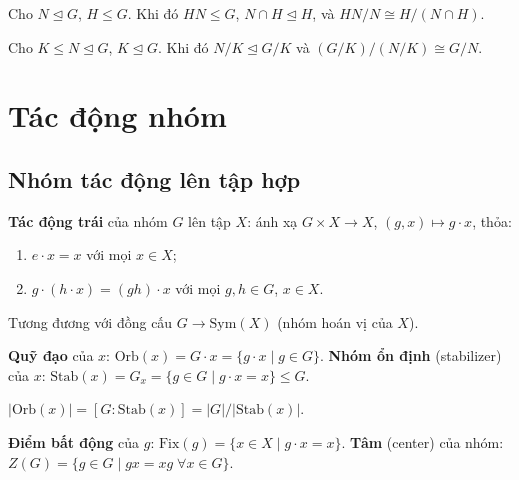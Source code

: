 \documentclass[12pt,a4paper]{article}
\begin{document}
\begin{dinhly}[title={Định lý đẳng cấu thứ hai}]
  Cho $N \trianglelefteq G$, $H \le G$. Khi đó $HN \le G$, $N \cap H \trianglelefteq H$, và $HN/N \cong H/(N \cap H)$.
\end{dinhly}

\begin{dinhly}[title={Định lý đẳng cấu thứ ba}]
  Cho $K \le N \trianglelefteq G$, $K \trianglelefteq G$. Khi đó $N/K \trianglelefteq G/K$ và $(G/K)/(N/K) \cong G/N$.
\end{dinhly}

\section{Tác động nhóm}

\subsection{Nhóm tác động lên tập hợp}

\begin{dinhnghia}
  \textbf{Tác động trái} của nhóm $G$ lên tập $X$: ánh xạ $G \times X \to X$, $(g, x) \mapsto g \cdot x$, thỏa:
  \begin{enumerate}
    \item $e \cdot x = x$ với mọi $x \in X$;
    \item $g \cdot (h \cdot x) = (gh) \cdot x$ với mọi $g, h \in G$, $x \in X$.
  \end{enumerate}
  Tương đương với đồng cấu $G \to \mathrm{Sym}(X)$ (nhóm hoán vị của $X$).
\end{dinhnghia}

\begin{dinhnghia}
  \textbf{Quỹ đạo} của $x$: $\mathrm{Orb}(x) = G \cdot x = \{g \cdot x \mid g \in G\}$. \textbf{Nhóm ổn định} (stabilizer) của $x$: $\mathrm{Stab}(x) = G_x = \{g \in G \mid g \cdot x = x\} \le G$.
\end{dinhnghia}

\begin{dinhly}[title={Định lý quỹ đạo -- ổn định}]
  $|\mathrm{Orb}(x)| = [G : \mathrm{Stab}(x)] = |G| / |\mathrm{Stab}(x)|$.
\end{dinhly}

\begin{dinhnghia}
  \textbf{Điểm bất động} của $g$: $\mathrm{Fix}(g) = \{x \in X \mid g \cdot x = x\}$. \textbf{Tâm} (center) của nhóm: $Z(G) = \{g \in G \mid gx = xg\; \forall x \in G\}$.
\end{dinhnghia}
\end{document}
